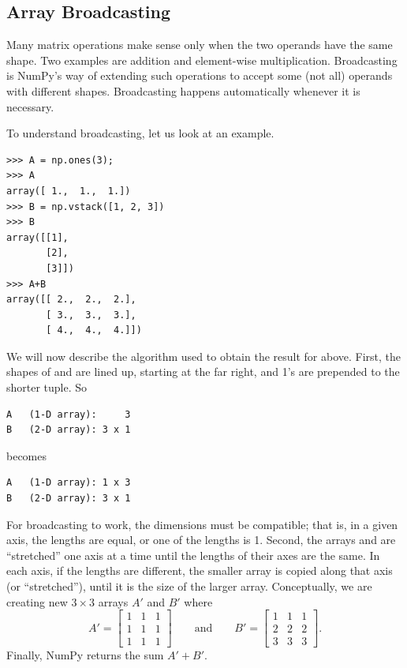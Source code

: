 
\subsection*{Array Broadcasting} %

Many matrix operations make sense only when the two operands have the same shape. 
Two examples are addition and element-wise multiplication. 
Broadcasting is NumPy's way of extending such operations to accept some (not all) operands with different shapes. 
Broadcasting happens automatically whenever it is necessary. 

To understand broadcasting, let us look at an example. 
\begin{lstlisting}
>>> A = np.ones(3);
>>> A
array([ 1.,  1.,  1.])
>>> B = np.vstack([1, 2, 3])
>>> B
array([[1],
       [2],
       [3]])
>>> A+B
array([[ 2.,  2.,  2.],
       [ 3.,  3.,  3.],
       [ 4.,  4.,  4.]])
\end{lstlisting}
We will now describe the algorithm used to obtain the result for  above. 
First, the shapes of  and  are lined up, starting at the far right, and 1's are prepended to the shorter tuple. So
\begin{lstlisting}
A   (1-D array):     3
B   (2-D array): 3 x 1
\end{lstlisting}
becomes
\begin{lstlisting}
A   (1-D array): 1 x 3
B   (2-D array): 3 x 1
\end{lstlisting}
For broadcasting to work, the dimensions must be compatible; that is, in a given axis, the lengths are equal, or one of the lengths is 1. 
Second, the arrays  and  are ``stretched'' one axis at a time until the lengths of their axes are the same. 
In each axis, if the lengths are different, the smaller array is copied along that axis (or ``stretched''), until it is the size of the larger array. 
Conceptually, we are creating new $3 \times 3$ arrays $A'$ and $B'$ where
\[
A' = \left[ \begin{array}{ccc}
1 & 1 & 1\\
1 & 1 & 1\\
1 & 1 & 1 \end{array} \right] \qquad \text{and} \qquad B' =  \left[ \begin{array}{ccc}
1 & 1 & 1\\
2 & 2 & 2\\
3 & 3 & 3\end{array} \right].
\]
Finally, NumPy returns the sum $A'+B'$.

